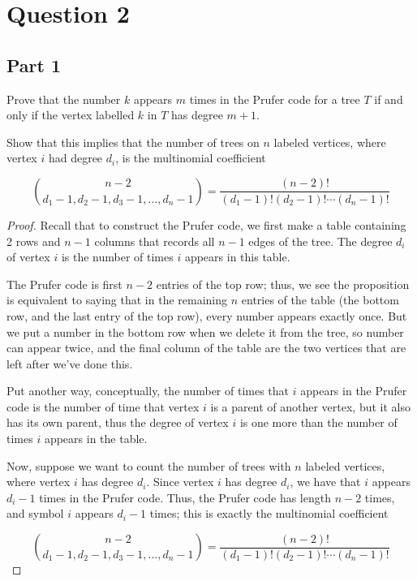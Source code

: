 \documentclass{amsart}
\begin{document}
\section{Question 2}
\subsection{Part 1}


Prove that the number $k$ appears $m$ times in the Prufer code for a tree $T$ if and only if the vertex labelled $k$ in $T$ has degree $m+1$.

Show that this implies that the number of trees on $n$ labeled vertices, where vertex $i$ had degree $d_i$, is the multinomial coefficient

$$\binom{n-2}{d_1-1, d_2-1,d_3-1,\dots, d_n-1}=\frac{(n-2)!}{(d_1-1)!(d_2-1)!\cdots (d_n-1)!}$$

\begin{proof}

  Recall that to construct the Prufer code, we first make a table containing 2 rows and $n-1$ columns that records all $n-1$ edges of the tree.  The degree $d_i$ of vertex $i$ is the number of times $i$ appears in this table.

  The Prufer code is first $n-2$ entries of the top row; thus, we see the proposition is equivalent to saying that in the remaining $n$ entries of the table (the bottom row, and the last entry of the top row), every number appears exactly once.  But we put a number in the bottom row when we delete it from the tree, so number can appear twice, and the final column of the table are the two vertices that are left after we've done this.

  Put another way, conceptually, the number of times that $i$ appears in the Prufer code is the number of time that vertex $i$ is a parent of another vertex, but it also has its own parent, thus the degree of vertex $i$ is one more than the number of times $i$ appears in the table.

  Now, suppose we want to count the number of trees with $n$ labeled vertices, where vertex $i$ has degree $d_i$.  Since vertex $i$ has degree $d_i$, we have that $i$ appears $d_i-1$ times in the Prufer code.  Thus, the Prufer code has length $n-2$ times, and symbol $i$ appears $d_i-1$ times; this is exactly the multinomial coefficient

$$\binom{n-2}{d_1-1, d_2-1,d_3-1,\dots, d_n-1}=\frac{(n-2)!}{(d_1-1)!(d_2-1)!\cdots (d_n-1)!}$$ 
  
  

\end{proof}
  
\end{document}
